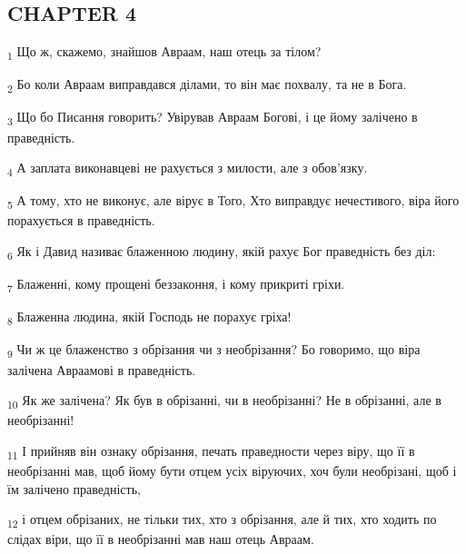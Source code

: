 \subsection{CHAPTER 4}
\begin{tcolorbox}
\textsubscript{1} Що ж, скажемо, знайшов Авраам, наш отець за тілом?
\end{tcolorbox}
\begin{tcolorbox}
\textsubscript{2} Бо коли Авраам виправдався ділами, то він має похвалу, та не в Бога.
\end{tcolorbox}
\begin{tcolorbox}
\textsubscript{3} Що бо Писання говорить? Увірував Авраам Богові, і це йому залічено в праведність.
\end{tcolorbox}
\begin{tcolorbox}
\textsubscript{4} А заплата виконавцеві не рахується з милости, але з обов'язку.
\end{tcolorbox}
\begin{tcolorbox}
\textsubscript{5} А тому, хто не виконує, але вірує в Того, Хто виправдує нечестивого, віра його порахується в праведність.
\end{tcolorbox}
\begin{tcolorbox}
\textsubscript{6} Як і Давид називає блаженною людину, якій рахує Бог праведність без діл:
\end{tcolorbox}
\begin{tcolorbox}
\textsubscript{7} Блаженні, кому прощені беззаконня, і кому прикриті гріхи.
\end{tcolorbox}
\begin{tcolorbox}
\textsubscript{8} Блаженна людина, якій Господь не порахує гріха!
\end{tcolorbox}
\begin{tcolorbox}
\textsubscript{9} Чи ж це блаженство з обрізання чи з необрізання? Бо говоримо, що віра залічена Авраамові в праведність.
\end{tcolorbox}
\begin{tcolorbox}
\textsubscript{10} Як же залічена? Як був в обрізанні, чи в необрізанні? Не в обрізанні, але в необрізанні!
\end{tcolorbox}
\begin{tcolorbox}
\textsubscript{11} І прийняв він ознаку обрізання, печать праведности через віру, що її в необрізанні мав, щоб йому бути отцем усіх віруючих, хоч були необрізані, щоб і їм залічено праведність,
\end{tcolorbox}
\begin{tcolorbox}
\textsubscript{12} і отцем обрізаних, не тільки тих, хто з обрізання, але й тих, хто ходить по слідах віри, що її в необрізанні мав наш отець Авраам.
\end{tcolorbox}
